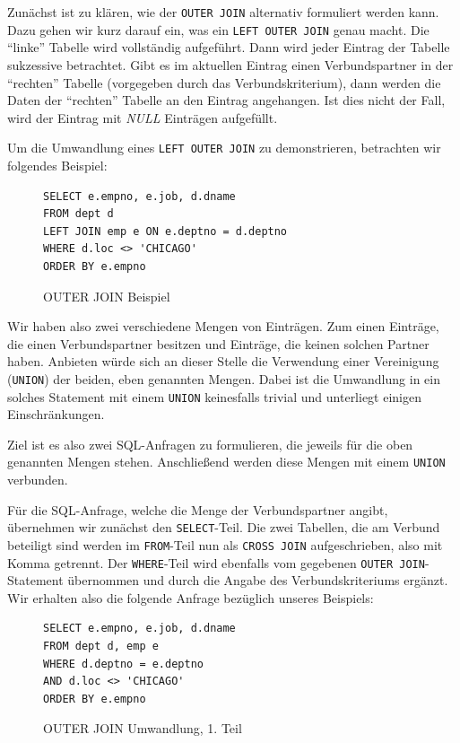Zunächst ist zu klären, wie der \verb|OUTER JOIN| alternativ formuliert werden kann. Dazu gehen wir kurz darauf ein, was ein \verb|LEFT OUTER JOIN| genau macht. Die ``linke'' Tabelle wird vollständig aufgeführt. Dann wird jeder Eintrag der Tabelle sukzessive betrachtet. Gibt es im aktuellen Eintrag einen Verbundspartner in der ``rechten'' Tabelle (vorgegeben durch das Verbundskriterium), dann werden die Daten der ``rechten'' Tabelle an den Eintrag angehangen. Ist dies nicht der Fall, wird der Eintrag mit \textit{NULL} Einträgen aufgefüllt. 

Um die Umwandlung eines \verb|LEFT OUTER JOIN| zu demonstrieren, betrachten wir folgendes Beispiel:

\begin{figure}[H]
\begin{verbatim}
SELECT e.empno, e.job, d.dname 
FROM dept d 
LEFT JOIN emp e ON e.deptno = d.deptno 
WHERE d.loc <> 'CHICAGO'
ORDER BY e.empno
\end{verbatim}
\caption{OUTER JOIN Beispiel}
\end{figure}

Wir haben also zwei verschiedene Mengen von Einträgen. Zum einen Einträge, die einen Verbundspartner besitzen und Einträge, die keinen solchen Partner haben. Anbieten würde sich an dieser Stelle die Verwendung einer Vereinigung (\verb|UNION|) der beiden, eben genannten Mengen. Dabei ist die Umwandlung in ein solches Statement mit einem \verb|UNION| keinesfalls trivial und unterliegt einigen Einschränkungen. 

Ziel ist es also zwei SQL-Anfragen zu formulieren, die jeweils für die oben genannten Mengen stehen. Anschließend werden diese Mengen mit einem \verb|UNION| verbunden.

Für die SQL-Anfrage, welche die Menge der Verbundspartner angibt, übernehmen wir zunächst den \verb|SELECT|-Teil. Die zwei Tabellen, die am Verbund beteiligt sind werden im \verb|FROM|-Teil nun als \verb|CROSS JOIN| aufgeschrieben, also mit Komma getrennt. Der \verb|WHERE|-Teil wird ebenfalls vom gegebenen \verb|OUTER JOIN|-Statement übernommen und durch die Angabe des Verbundskriteriums ergänzt.
Wir erhalten also die folgende Anfrage bezüglich unseres Beispiels:

\begin{figure}[H]
\begin{verbatim}
SELECT e.empno, e.job, d.dname 
FROM dept d, emp e
WHERE d.deptno = e.deptno
AND d.loc <> 'CHICAGO'
ORDER BY e.empno
\end{verbatim}
\caption{OUTER JOIN Umwandlung, 1. Teil}
\end{figure}

